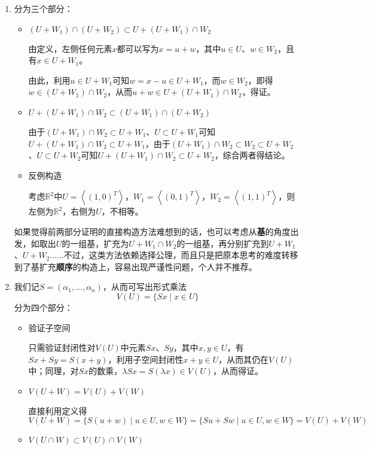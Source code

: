 \documentclass[a4paper,UTF8,fontset=windows,AutoFakeBold]{ctexart}
\newcommand*{\note}{\noindent *}
\begin{document}
\begin{enumerate}
    \item 分为三个部分：
    \begin{itemize}
        \item $(U+W_1)\cap(U+W_2)\subset U+(U+W_1)\cap W_2$
        
        由定义，左侧任何元素$x$都可以写为$x=u+w$，其中$u\in U$、$w\in W_2$，且有$x\in U+W_1$。

        由此，利用$u\in U+W_1$可知$w=x-u\in U+W_1$，而$w\in W_2$，即得$w\in(U+W_1)\cap W_2$，从而$u+w\in U+(U+W_1)\cap W_2$，得证。

        \item $U+(U+W_1)\cap W_2\subset(U+W_1)\cap(U+W_2)$
        
        由于$(U+W_1)\cap W_2\subset U+W_1$、$U\subset U+W_1$可知$U+(U+W_1)\cap W_2\subset U+W_1$，由于$(U+W_1)\cap W_2\subset W_2\subset U+W_2$、$U\subset U+W_2$可知$U+(U+W_1)\cap W_2\subset U+W_2$，综合两者得结论。
        
        \item 反例构造
        
        考虑$\mathbb{R}^2$中$U=\left<(1,0)^T\right>$，$W_1=\left<(0,1)^T\right>$，$W_2=\left<(1,1)^T\right>$，则左侧为$\mathbb{R}^2$，右侧为$U$，不相等。
    \end{itemize}

    \note 如果觉得前两部分证明的直接构造方法难想到的话，也可以考虑从\textbf{基}的角度出发，如取出$U$的一组基，扩充为$U+W_1\cap W_2$的一组基，再分别扩充到$U+W_1$、$U+W_2$......不过，这类方法依赖选择公理，而且只是把原本思考的难度转移到了基扩充\textbf{顺序}的构造上，容易出现严谨性问题，个人并不推荐。

    \item 我们记$S=(\alpha_1,\dots,\alpha_n)$，从而可写出形式乘法
    $$V(U)=\{Sx\mid x\in U\}$$
    分为四个部分：
    \begin{itemize}
        \item 验证子空间
        
        只需验证封闭性对$V(U)$中元素$Sx$、$Sy$，其中$x,y\in U$，有$Sx+Sy=S(x+y)$，利用子空间封闭性$x+y\in U$，从而其仍在$V(U)$中；同理，对$Sx$的数乘，$\lambda Sx=S(\lambda x)\in V(U)$，从而得证。
        
        \item $V(U+W)=V(U)+V(W)$
        
        直接利用定义得
        $$V(U+W)=\{S(u+w)\mid u\in U,w\in W\}=\{Su+Sw\mid u\in U,w\in W\}=V(U)+V(W)$$
        
        \item $V(U\cap W)\subset V(U)\cap V(W)$
        

\end{itemize}
\end{enumerate}
\end{document}
